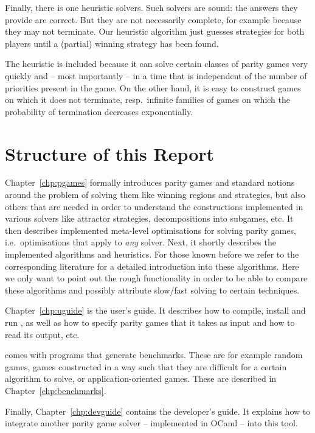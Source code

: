 Finally, there is one heuristic solvers. Such solvers are sound: the answers they provide are correct.
But they are not necessarily complete, for example because they may not terminate. Our heuristic
algorithm just guesses strategies for both players until a (partial) winning strategy has been found.

The heuristic is included because it can solve certain classes of parity games very quickly and
-- most importantly -- in a time that is independent of the number of priorities present in the game.
On the other hand, it is easy to construct games on which it does not terminate, resp.\ infinite families
of games on which the probability of termination decreases exponentially.



\section{Structure of this Report}

Chapter~\ref{chp:pgames} formally introduces parity games and standard notions around the problem of solving them
like winning regions and strategies, but also others that are needed in order to understand the constructions
implemented in various solvers like attractor strategies, decompositions into subgames, etc. It then
describes implemented meta-level optimisations for solving parity games, i.e.\ optimisations that apply to
\emph{any} solver. Next, it shortly describes the implemented algorithms and heuristics. For those known
before we refer to the corresponding literature for a detailed introduction into these algorithms. Here we
only want to point out the rough functionality in order to be able to compare these algorithms and possibly
attribute slow/fast solving to certain techniques.

Chapter~\ref{chp:uguide} is the user's guide. It describes how to compile, install and run \pgsolver, as well
as how to specify parity games that it takes as input and how to read its output, etc.

\pgsolver comes with programs that generate benchmarks. These are for example random games, games
constructed in a way such that they are difficult for a certain algorithm to solve, or application-oriented
games. These are described in Chapter~\ref{chp:benchmarks}.

Finally, Chapter~\ref{chp:devguide} contains the developer's guide. It explains how to
integrate another parity game solver -- implemented in OCaml -- into this tool.

